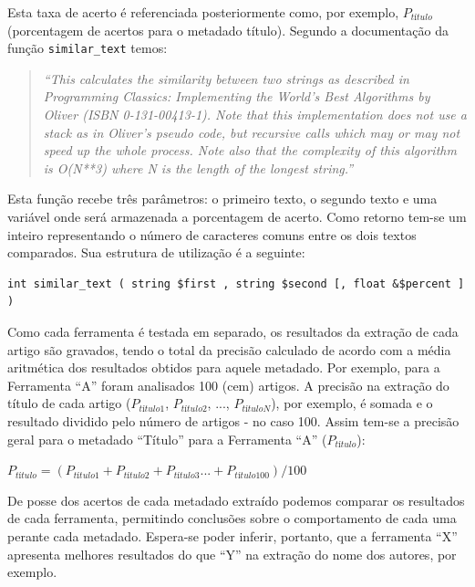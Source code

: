 Esta taxa de acerto é referenciada posteriormente como, por exemplo, $P_{título}$ (porcentagem de acertos para o metadado título). Segundo a documentação da função \texttt{similar\_text} temos:

\begin{quote}
    \emph{``This calculates the similarity between two strings as described in Programming Classics: Implementing the World's Best Algorithms by Oliver (ISBN 0-131-00413-1). Note that this implementation does not use a stack as in Oliver's pseudo code, but recursive calls which may or may not speed up the whole process. Note also that the complexity of this algorithm is O(N**3) where N is the length of the longest string.''}
\end{quote}

Esta função recebe três parâmetros: o primeiro texto, o segundo texto e uma variável onde será armazenada a porcentagem de acerto. Como retorno tem-se um inteiro representando o número de caracteres comuns entre os dois textos comparados. Sua estrutura de utilização é a seguinte:

\lstset{language=PHP}
\begin{lstlisting}[escapechar=\#]
int similar_text ( string $first , string $second [, float &$percent ] )
\end{lstlisting}

Como cada ferramenta é testada em separado, os resultados da extração de cada artigo são gravados, tendo o total da precisão calculado de acordo com a média aritmética dos resultados obtidos para aquele metadado. Por exemplo, para a Ferramenta ``A'' foram analisados 100 (cem) artigos. A precisão na extração do título de cada artigo ($P_{título1}$, $P_{título2}$, ..., $P_{títuloN}$), por exemplo, é somada e o resultado dividido pelo número de artigos - no caso 100. Assim tem-se a precisão geral para o metadado ``Título'' para a Ferramenta ``A'' ($P_{título}$):

\begin{center}
    \begin{math}
        P_{título} = (P_{título1} + P_{título2} + P_{título3} ... + P_{título100}) / 100
        \label{math:result-by-metadata}
    \end{math}
\end{center}

De posse dos acertos de cada metadado extraído podemos comparar os resultados de cada ferramenta, permitindo conclusões sobre o comportamento de cada uma perante cada metadado. Espera-se poder inferir, portanto, que a ferramenta ``X'' apresenta melhores resultados do que ``Y'' na extração do nome dos autores, por exemplo.

